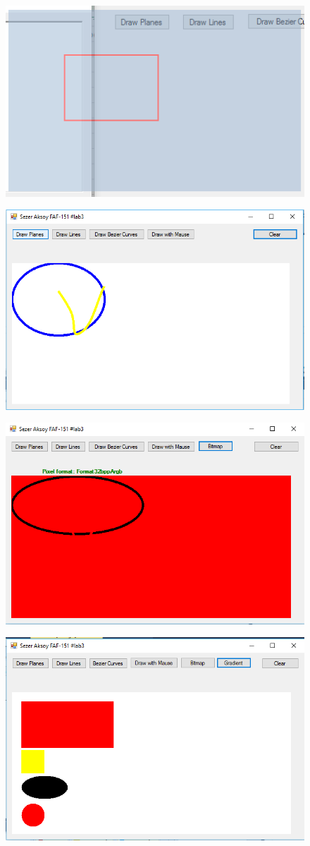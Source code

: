 \begin{figure}
	\centering
	\includegraphics[width=0.7\linewidth]{../../LAB3/img/7}
	\caption{}
	\label{fig:7}
\end{figure}


\begin{figure}
	\centering
	\includegraphics[width=0.7\linewidth]{../../LAB3/img/8}
	\caption{}
	\label{fig:8}
\end{figure}


\begin{figure}
	\centering
	\includegraphics[width=0.7\linewidth]{../../LAB3/img/9}
	\caption{}
	\label{fig:9}
\end{figure}


\begin{figure}
	\centering
	\includegraphics[width=0.7\linewidth]{../../LAB3/img/10}
	\caption{}
	\label{fig:10}
\end{figure}




\clearpage